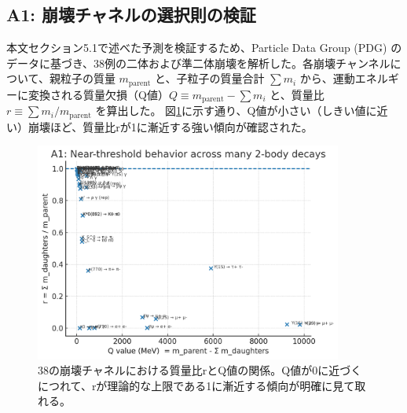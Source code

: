 \documentclass[11pt,a4paper,ja=standard]{ltjarticle}
\begin{document}
\subsection{A1: 崩壊チャネルの選択則の検証}
本文セクション5.1で述べた予測を検証するため、Particle Data Group (PDG) のデータに基づき、38例の二体および準二体崩壊を解析した。各崩壊チャンネルについて、親粒子の質量 $m_{\text{parent}}$ と、子粒子の質量合計 $\sum m_i$ から、運動エネルギーに変換される質量欠損（Q値）$Q \equiv m_{\text{parent}}-\sum m_i$ と、質量比 $r \equiv \sum m_i/m_{\text{parent}}$ を算出した。
図\ref{fig:decay_q_value}に示す通り、Q値が小さい（しきい値に近い）崩壊ほど、質量比rが1に漸近する強い傾向が確認された。
\begin{figure}[h!]
    \centering
    \includegraphics[width=0.9\textwidth]{A1_plot.png} 
    \caption{38の崩壊チャネルにおける質量比rとQ値の関係。Q値が0に近づくにつれて、rが理論的な上限である1に漸近する傾向が明確に見て取れる。}
    \label{fig:decay_q_value}
\end{figure}
\end{document}

